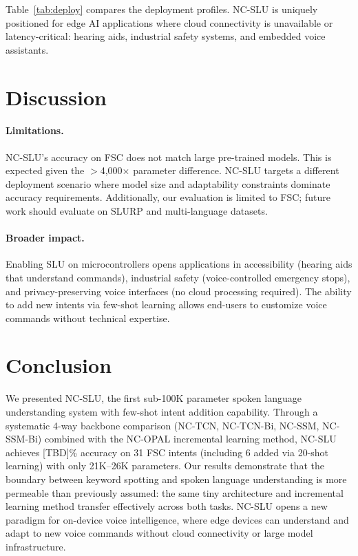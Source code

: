 \documentclass[11pt]{article}
\begin{document}
Table~\ref{tab:deploy} compares the deployment profiles.
NC-SLU is uniquely positioned for edge AI applications where cloud connectivity is unavailable or latency-critical: hearing aids, industrial safety systems, and embedded voice assistants.

\section{Discussion}

\paragraph{Limitations.}
NC-SLU's accuracy on FSC does not match large pre-trained models.
This is expected given the $>$4,000$\times$ parameter difference.
NC-SLU targets a different deployment scenario where model size and adaptability constraints dominate accuracy requirements.
Additionally, our evaluation is limited to FSC; future work should evaluate on SLURP \cite{bastianelli2020slurp} and multi-language datasets.

\paragraph{Broader impact.}
Enabling SLU on microcontrollers opens applications in accessibility (hearing aids that understand commands), industrial safety (voice-controlled emergency stops), and privacy-preserving voice interfaces (no cloud processing required).
The ability to add new intents via few-shot learning allows end-users to customize voice commands without technical expertise.

\section{Conclusion}

We presented NC-SLU, the first sub-100K parameter spoken language understanding system with few-shot intent addition capability.
Through a systematic 4-way backbone comparison (NC-TCN, NC-TCN-Bi, NC-SSM, NC-SSM-Bi) combined with the NC-OPAL incremental learning method, NC-SLU achieves [TBD]\% accuracy on 31 FSC intents (including 6 added via 20-shot learning) with only 21K--26K parameters.
Our results demonstrate that the boundary between keyword spotting and spoken language understanding is more permeable than previously assumed: the same tiny architecture and incremental learning method transfer effectively across both tasks.
NC-SLU opens a new paradigm for on-device voice intelligence, where edge devices can understand and adapt to new voice commands without cloud connectivity or large model infrastructure.
\end{document}
